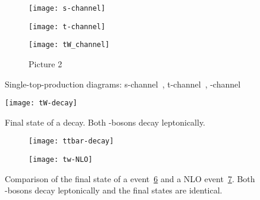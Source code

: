 \begin{figure}[htbp]
  \begin{subfigure}[b]{0.3\textwidth}
  	\centering
    \texttt{[image: s-channel]}
    \caption{}
    \label{fig:singletop:virtualWt}
  \end{subfigure}
  \quad
  \begin{subfigure}[b]{0.3\textwidth}
  	\centering
    \texttt{[image: t-channel]}
    \caption{}
    \label{fig:singletop:virtualWs}
  \end{subfigure}
  \quad
  \begin{subfigure}[b]{0.3\textwidth}
  	\centering
    \texttt{[image: tW\_channel]}
    \caption{Picture 2}
	\label{fig:singletop:tW}
  \end{subfigure} 
  \caption[Single-top-production diagrams]{Single-top-production diagrams: s-channel~, t-channel~, \tW-channel~}
  \label{fig:singletop}
\end{figure}


\begin{figure}[htbp]
	\centering
	\texttt{[image: tW-decay]}
	\caption[Final state of a \tW decay]{Final state of a \tW decay. Both \PW-bosons decay leptonically.}
	\label{fig:tw-decay}
\end{figure}

\begin{figure}[htbp]
    \centering
    \begin{subfigure}[b]{0.44\textwidth}
        \texttt{[image: ttbar-decay]}
        \caption{}
        \label{fig:nlo:ttbar}
    \end{subfigure}
\quad
    \begin{subfigure}[b]{0.44\textwidth}
        \texttt{[image: tw-NLO]}
        \caption{}
        \label{fig:nlo:tw}
    \end{subfigure}
    \caption[Comparison of the final state of a \ttbar and \tW event]{Comparison of the final state of a \ttbar event~\ref{fig:nlo:ttbar} and a NLO \tW event~\ref{fig:nlo:tw}. Both \PW-bosons decay leptonically and the final states are identical.}
	\label{fig:nlo}
\end{figure}